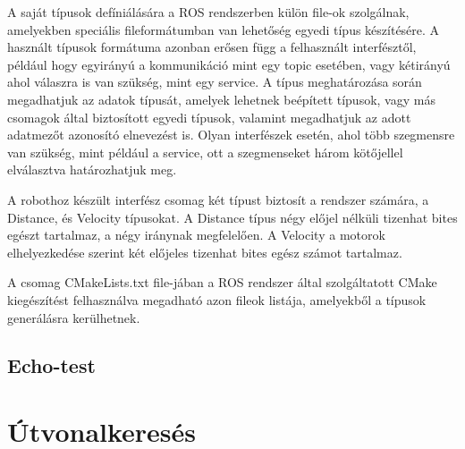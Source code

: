 A saját típusok defíniálására a ROS rendszerben külön file-ok szolgálnak,
amelyekben speciális fileformátumban van lehetőség egyedi típus készítésére. A
használt típusok formátuma azonban erősen függ a felhasznált interfésztől,
például hogy egyirányú a kommunikáció mint egy topic esetében, vagy kétirányú
ahol válaszra is van szükség, mint egy service. A típus meghatározása során
megadhatjuk az adatok típusát, amelyek lehetnek beépített típusok, vagy más
csomagok által biztosított egyedi típusok, valamint megadhatjuk az adott
adatmezőt azonosító elnevezést is. Olyan interfészek esetén, ahol több szegmensre
van szükség, mint például a service, ott a szegmenseket három kötőjellel
elválasztva határozhatjuk meg. 

A robothoz készült interfész csomag két típust biztosít a rendszer számára, a
Distance, és Velocity típusokat. A Distance típus négy előjel nélküli tizenhat
bites egészt tartalmaz, a négy iránynak megfelelően. A Velocity a motorok
elhelyezkedése szerint két előjeles tizenhat bites egész számot tartalmaz.

A csomag CMakeLists.txt file-jában a ROS rendszer által szolgáltatott CMake
kiegészítést felhasználva megadható azon fileok listája, amelyekből a típusok
generálásra kerülhetnek.

\subsection{Echo-test}

\section{Útvonalkeresés}

